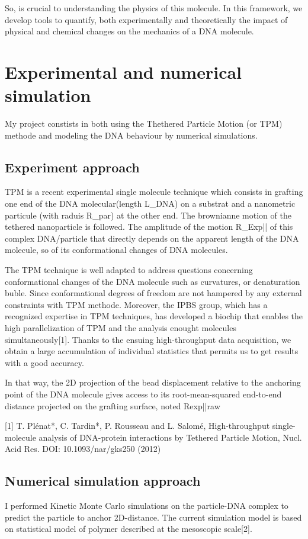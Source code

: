 So, is crucial to understanding the physics of this molecule. In this framework, we develop tools to quantify, both experimentally and theoretically the impact of physical and chemical changes on the mechanics of a DNA molecule.


\section{Experimental and numerical simulation}
My project constists in both using the Thethered Particle Motion (or TPM) methode and modeling the DNA behaviour by numerical simulations.

\subsection{Experiment approach}
TPM is a recent experimental single molecule technique which consists in grafting one end of the DNA molecular(length L_{DNA}) on a substrat and a nanometric particule (with raduis R_{par}) at the other end. The brownianne motion of the tethered nanoparticle is followed. The amplitude of the motion R_{Exp||} of this complex DNA/particle that directly depends on the apparent length of the DNA molecule, so of its conformational changes of DNA molecules.

The TPM technique is well adapted to address questions concerning conformational changes of the DNA molecule such as curvatures, or denaturation buble. Since conformational degrees of freedom are not hampered by any external constraints with TPM methode. Moreover, the IPBS group, which has a recognized expertise in TPM techniques, has developed a biochip that enables the high parallelization of TPM and the analysis enought molecules simultaneously[1]. Thanks to the ensuing high-throughput data acquisition, we obtain a large accumulation of individual statistics that permits us to get results with a good accuracy. 

In that way, the 2D projection of the bead displacement relative to the anchoring point of the DNA molecule gives access to its root-mean-squared end-to-end distance projected on the grafting surface, noted Rexp||raw

[1] T. Plénat*, C. Tardin*, P. Rousseau and L. Salomé, High-throughput single-molecule analysis of DNA-protein interactions by Tethered Particle Motion, Nucl. Acid Res. DOI: 10.1093/nar/gks250 (2012)

\subsection{Numerical simulation approach}
I performed Kinetic Monte Carlo simulations on the particle-DNA complex to predict the particle to anchor 2D-distance. The current simulation model is based on statistical model of polymer described at the mesoscopic scale[2].

